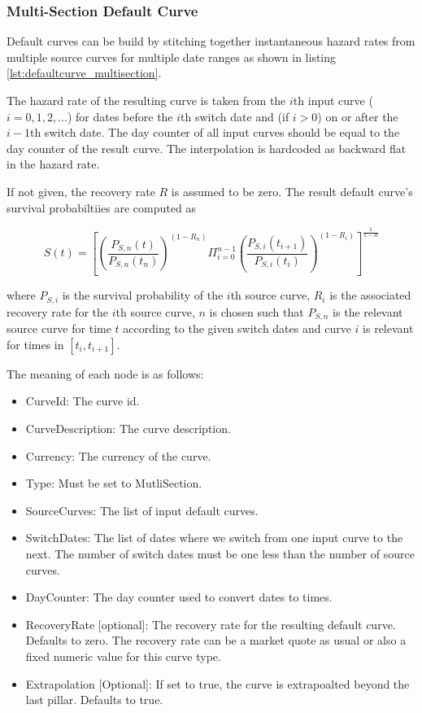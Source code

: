\subsubsection{Multi-Section Default Curve}\label{ss:multisection_default_curve}

Default curves can be build by stitching together instantaneous hazard rates from multiple source curves for multiple
date ranges as shown in listing \ref{lst:defaultcurve_multisection}.

The hazard rate of the resulting curve is taken from the $i$th input curve ($i=0,1,2,\ldots$) for dates before the $i$th
switch date and (if $i>0$) on or after the $i-1$th switch date. The day counter of all input curves should be equal to
the day counter of the result curve. The interpolation is hardcoded as backward flat in the hazard rate.

If not given, the recovery rate $R$ is assumed to be zero. The result default curve's survival probabiltiies are
computed as

\begin{equation}
  S(t) = \left[ \left(\frac{P_{S,n}(t)}{P_{S,n}(t_{n})}\right)^{(1-R_n)} \Pi_{i=0}^{n-1} \left(\frac{P_{S,i}(t_{i+1})}{P_{S,i}(t_{i})}\right)^{(1-R_i)} \right] ^ { \frac{1}{1-R} }
\end{equation}

where $P_{S,i}$ is the survival probability of the $i$th source curve, $R_i$ is the associated recovery rate for the
$i$th source curve, $n$ is chosen such that $P_{S,n}$ is the relevant source curve for time $t$ according to the given
switch dates and curve $i$ is relevant for times in $[t_i,t_{i+1}]$.

The meaning of each node is as follows:

\begin{itemize}
\item CurveId: The curve id.
\item CurveDescription: The curve description.
\item Currency: The currency of the curve.
\item Type: Must be set to MutliSection.
\item SourceCurves: The list of input default curves.
\item SwitchDates: The list of dates where we switch from one input curve to the next. The number of switch dates must
  be one less than the number of source curves.
\item DayCounter: The day counter used to convert dates to times.
\item RecoveryRate [optional]: The recovery rate for the resulting default curve. Defaults to zero. The recovery rate
  can be a market quote as usual or also a fixed numeric value for this curve type.
\item Extrapolation [Optional]: If set to true, the curve is extrapoalted beyond the last pillar. Defaults to true.
\end{itemize}


